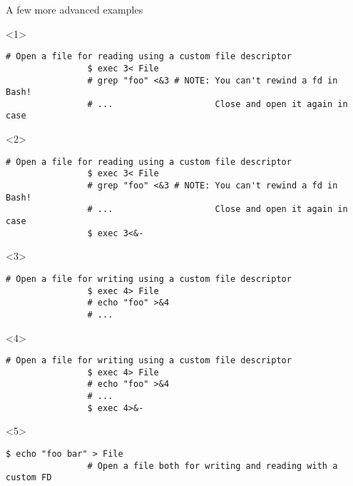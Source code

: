 \begin{frame}[fragile]{A few more advanced examples}
    \begin{overlayarea}{\textwidth}{0.33\textheight}
        \begin{onlyenv}<1>
            \begin{lstlisting}[style=MyBash, numbers=none, xrightmargin=3mm]
                # Open a file for reading using a custom file descriptor
                $ exec 3< File
                # grep "foo" <&3 # NOTE: You can't rewind a fd in Bash!
                # ...                    Close and open it again in case
            \end{lstlisting}
        \end{onlyenv}
        \begin{onlyenv}<2>
            \begin{lstlisting}[style=MyBash, numbers=none, xrightmargin=3mm]
                # Open a file for reading using a custom file descriptor
                $ exec 3< File
                # grep "foo" <&3 # NOTE: You can't rewind a fd in Bash!
                # ...                    Close and open it again in case
                $ exec 3<&-
            \end{lstlisting}
        \end{onlyenv}
        \begin{onlyenv}<3>
            \begin{lstlisting}[style=MyBash, numbers=none, xrightmargin=3mm]
                # Open a file for writing using a custom file descriptor
                $ exec 4> File
                # echo "foo" >&4
                # ...
            \end{lstlisting}
        \end{onlyenv}
        \begin{onlyenv}<4>
            \begin{lstlisting}[style=MyBash, numbers=none, xrightmargin=3mm]
                # Open a file for writing using a custom file descriptor
                $ exec 4> File
                # echo "foo" >&4
                # ...
                $ exec 4>&-
            \end{lstlisting}
        \end{onlyenv}
        \begin{onlyenv}<5>
            \begin{lstlisting}[style=MyBash, numbers=none, xrightmargin=3mm]
                $ echo "foo bar" > File
                # Open a file both for writing and reading with a custom FD

\end{lstlisting}
\end{onlyenv}
\end{overlayarea}
\end{frame}
